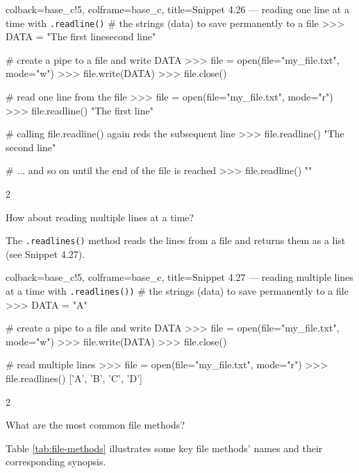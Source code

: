 \documentclass[a4paper,11pt]{book}
\newcommand{\question}[1]{%
    \begin{tcolorbox}[colback=comp_c!10,colframe=comp_c,sidebyside align=top,width=\linewidth,before skip=1ex]
        #1
    \end{tcolorbox}
    \switchcolumn%
}
\newcommand{\note}[1]{%
    \begin{tcolorbox}[colback=white!0,colframe=white!10,width=\linewidth,before skip=1ex]
        #1
    \end{tcolorbox}
}
\begin{document}
\begin{pythoncode}[linenos=true,]{colback=base_c!5, colframe=base_c, title=\sffamily Snippet 4.26 --- reading one line at a time with \texttt{.readline()}}
# the strings (data) to save permanently to a file
>>> DATA = "The first line\nThe second line" 

# create a pipe to a file and write DATA
>>> file = open(file="my_file.txt", mode="w")
>>> file.write(DATA)
>>> file.close()

# read one line from the file
>>> file = open(file="my_file.txt", mode="r")
>>> file.readline()
"The first line\n"

# calling file.readline() again reds the subsequent line 
>>> file.readline()
"The second line"

# ... and so on until the end of the file is reached
>>> file.readline()
""
\end{pythoncode}

\begin{paracol}{2}
	\question{\raggedright How about reading multiple lines at a time?}
	\note{The \texttt{.readlines()} method reads the lines from a file and returns them as a list (see Snippet 4.27).}
\end{paracol}
\clearpage

\begin{pythoncode}[linenos=true,]{colback=base_c!5, colframe=base_c, title=\sffamily Snippet 4.27 --- reading multiple lines at a time with \texttt{.readlines())}}
# the strings (data) to save permanently to a file
>>> DATA = "A\nB\nC\nD" 

# create a pipe to a file and write DATA
>>> file = open(file="my_file.txt", mode="w")
>>> file.write(DATA)
>>> file.close()

# read multiple lines 
>>> file = open(file="my_file.txt", mode="r")
>>> file.readlines()
['A\n', 'B\n', 'C\n', 'D']

\end{pythoncode}

\begin{paracol}{2}
	\question{\raggedright What are the most common file methods?}
	\note{Table \ref{tab:file-methods} illustrates some key file methods' names and their corresponding synopsis.}
\end{paracol}
\end{document}
